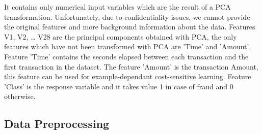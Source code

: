 It contains only numerical input variables which are the result of a PCA transformation. Unfortunately, due to confidentiality issues, we cannot provide the original features and more background information about the data. Features V1, V2, … V28 are the principal components obtained with PCA, the only features which have not been transformed with PCA are 'Time' and 'Amount'. Feature 'Time' contains the seconds elapsed between each transaction and the first transaction in the dataset. The feature 'Amount' is the transaction Amount, this feature can be used for example-dependant cost-sensitive learning. Feature 'Class' is the response variable and it takes value 1 in case of fraud and 0 otherwise.

\subsection{Data Preprocessing}
